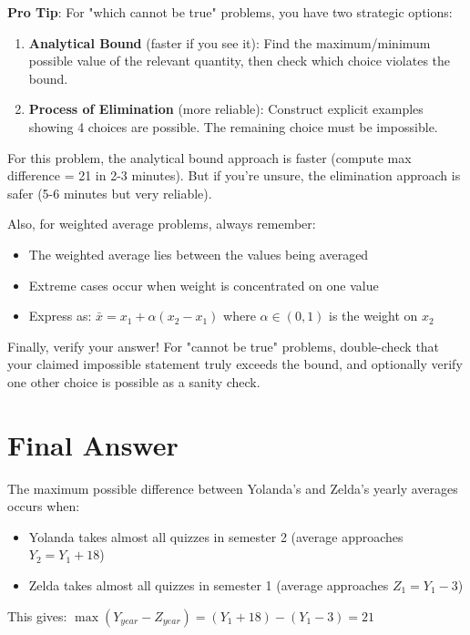 \documentclass[12pt]{article}
\begin{document}
\begin{tipbox}
\textbf{Pro Tip}: For "which cannot be true" problems, you have two strategic options:
\begin{enumerate}
    \item \textbf{Analytical Bound} (faster if you see it): Find the maximum/minimum possible value of the relevant quantity, then check which choice violates the bound.
    \item \textbf{Process of Elimination} (more reliable): Construct explicit examples showing 4 choices are possible. The remaining choice must be impossible.
\end{enumerate}

For this problem, the analytical bound approach is faster (compute max difference = 21 in 2-3 minutes). But if you're unsure, the elimination approach is safer (5-6 minutes but very reliable).

Also, for weighted average problems, always remember:
\begin{itemize}
    \item The weighted average lies between the values being averaged
    \item Extreme cases occur when weight is concentrated on one value
    \item Express as: $\bar{x} = x_1 + \alpha(x_2 - x_1)$ where $\alpha \in (0,1)$ is the weight on $x_2$
\end{itemize}

Finally, verify your answer! For "cannot be true" problems, double-check that your claimed impossible statement truly exceeds the bound, and optionally verify one other choice is possible as a sanity check.
\end{tipbox}

\section*{Final Answer}

The maximum possible difference between Yolanda's and Zelda's yearly averages occurs when:
\begin{itemize}
    \item Yolanda takes almost all quizzes in semester 2 (average approaches $Y_2 = Y_1 + 18$)
    \item Zelda takes almost all quizzes in semester 1 (average approaches $Z_1 = Y_1 - 3$)
\end{itemize}

This gives: $\max(Y_{year} - Z_{year}) = (Y_1 + 18) - (Y_1 - 3) = 21$
\end{document}
